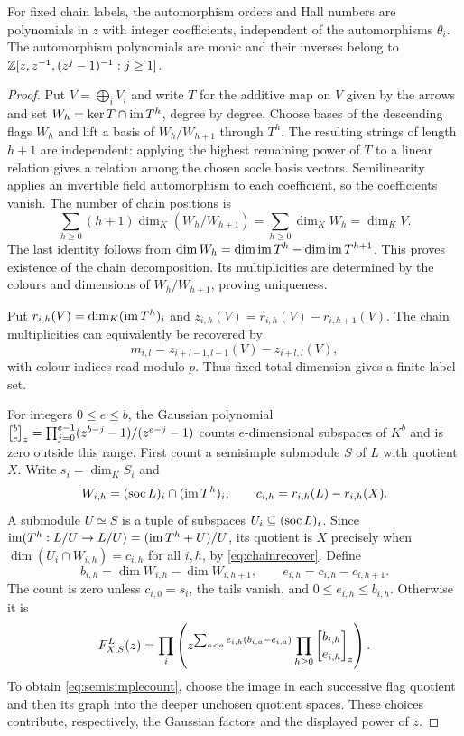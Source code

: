 \begin{lemma}\label{lem:cyclic}
For fixed chain labels, the automorphism orders and Hall numbers are polynomials in $z$ with integer coefficients, independent of the automorphisms $\theta_i$. The automorphism polynomials are monic and their inverses belong to $\mathbb Z[z,z^{-1},(z^j-1)^{-1}:j\ge1]$.
\end{lemma}
\begin{proof}
Put $V=\bigoplus_iV_i$ and write $T$ for the additive map on $V$ given by the arrows and set $W_h=\ker T\cap\operatorname{im} T^h$, degree by degree. Choose bases of the descending flags $W_h$ and lift a basis of $W_h/W_{h+1}$ through $T^h$. The resulting strings of length $h+1$ are independent: applying the highest remaining power of $T$ to a linear relation gives a relation among the chosen socle basis vectors. Semilinearity applies an invertible field automorphism to each coefficient, so the coefficients vanish. The number of chain positions is
\[
 \sum_{h\ge0}(h+1)\dim_K(W_h/W_{h+1})
 =\sum_{h\ge0}\dim_KW_h=\dim_KV.
\]
The last identity follows from
$\dim W_h=\dim\operatorname{im} T^h-\dim\operatorname{im} T^{h+1}$.
This proves existence of the chain decomposition. Its multiplicities are determined by the colours and dimensions of $W_h/W_{h+1}$, proving uniqueness.

Put $r_{i,h}(V)=\dim_K(\operatorname{im} T^h)_i$ and
$z_{i,h}(V)=r_{i,h}(V)-r_{i,h+1}(V)$. The chain multiplicities can equivalently be recovered by
\begin{equation}\label{eq:chainrecover}
 m_{i,l}=z_{i+l-1,l-1}(V)-z_{i+l,l}(V),
\end{equation}
with colour indices read modulo $p$. Thus fixed total dimension gives a finite label set.

For integers $0\le e\le b$, the Gaussian polynomial
$\gauss be z=\prod_{j=0}^{e-1}(z^{b-j}-1)/(z^{e-j}-1)$
counts $e$-dimensional subspaces of $K^b$ and is zero outside this range. 
First count a semisimple submodule $S$ of $L$ with quotient $X$. Write $s_i=\dim_KS_i$ and
\[
 W_{i,h}=(\operatorname{soc} L)_i\cap(\operatorname{im} T^h)_i,\qquad
 c_{i,h}=r_{i,h}(L)-r_{i,h}(X).
\]
A submodule $U\simeq S$ is a tuple of subspaces $U_i\subseteq(\operatorname{soc} L)_i$. Since
$\operatorname{im}(T^h:L/U\to L/U)=(\operatorname{im} T^h+U)/U$,
its quotient is $X$ precisely when
$\dim(U_i\cap W_{i,h})=c_{i,h}$ for all $i,h$, by \eqref{eq:chainrecover}. Define
\[
 b_{i,h}=\dim W_{i,h}-\dim W_{i,h+1},\qquad
 e_{i,h}=c_{i,h}-c_{i,h+1}.
\]
The count is zero unless $c_{i,0}=s_i$, the tails vanish, and $0\le e_{i,h}\le b_{i,h}$. Otherwise it is
\begin{equation}\label{eq:semisimplecount}
 F^L_{X,S}(z)=
 \prod_i\left(z^{\sum_{h<a}e_{i,h}(b_{i,a}-e_{i,a})}
 \prod_{h\ge0}\gauss{b_{i,h}}{e_{i,h}}{z}\right).
\end{equation}
To obtain \eqref{eq:semisimplecount}, choose the image in each successive flag quotient and then its graph into the deeper unchosen quotient spaces. These choices contribute, respectively, the Gaussian factors and the displayed power of $z$.


\end{proof}
